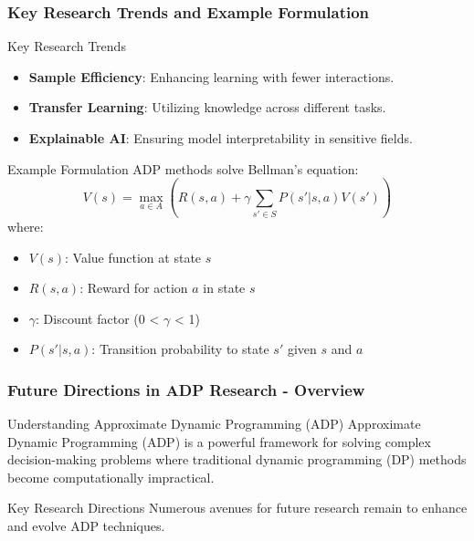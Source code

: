 \documentclass[aspectratio=169]{beamer}
\begin{document}
\begin{frame}[fragile]
    \frametitle{Key Research Trends and Example Formulation}
    \begin{block}{Key Research Trends}
        \begin{itemize}
            \item \textbf{Sample Efficiency}: Enhancing learning with fewer interactions.
            \item \textbf{Transfer Learning}: Utilizing knowledge across different tasks.
            \item \textbf{Explainable AI}: Ensuring model interpretability in sensitive fields.
        \end{itemize}
    \end{block}

    \begin{block}{Example Formulation}
        ADP methods solve Bellman's equation:
        \begin{equation}
        V(s) = \max_{a \in A} \left( R(s, a) + \gamma \sum_{s' \in S} P(s' | s, a) V(s') \right)
        \end{equation}
        where:
        \begin{itemize}
            \item \( V(s) \): Value function at state \( s \)
            \item \( R(s, a) \): Reward for action \( a \) in state \( s \)
            \item \( \gamma \): Discount factor (0 < \( \gamma \) < 1)
            \item \( P(s' | s, a) \): Transition probability to state \( s' \) given \( s \) and \( a \)
        \end{itemize}
    \end{block}
\end{frame}

\begin{frame}[fragile]
    \frametitle{Future Directions in ADP Research - Overview}
    \begin{block}{Understanding Approximate Dynamic Programming (ADP)}
        Approximate Dynamic Programming (ADP) is a powerful framework for solving complex decision-making problems where traditional dynamic programming (DP) methods become computationally impractical.
    \end{block}
    \begin{block}{Key Research Directions}
        Numerous avenues for future research remain to enhance and evolve ADP techniques.
    \end{block}
\end{frame}
\end{document}
